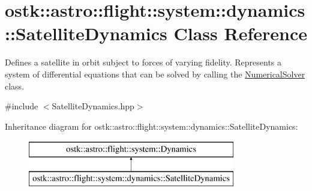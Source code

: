 \hypertarget{classostk_1_1astro_1_1flight_1_1system_1_1dynamics_1_1_satellite_dynamics}{}\section{ostk\+:\+:astro\+:\+:flight\+:\+:system\+:\+:dynamics\+:\+:Satellite\+Dynamics Class Reference}
\label{classostk_1_1astro_1_1flight_1_1system_1_1dynamics_1_1_satellite_dynamics}


Defines a satellite in orbit subject to forces of varying fidelity. Represents a system of differential equations that can be solved by calling the \hyperlink{classostk_1_1astro_1_1_numerical_solver}{Numerical\+Solver} class.  




{\ttfamily \#include $<$Satellite\+Dynamics.\+hpp$>$}

Inheritance diagram for ostk\+:\+:astro\+:\+:flight\+:\+:system\+:\+:dynamics\+:\+:Satellite\+Dynamics\+:\begin{figure}[H]
\begin{center}
\leavevmode
\includegraphics[height=2.000000cm]{classostk_1_1astro_1_1flight_1_1system_1_1dynamics_1_1_satellite_dynamics}
\end{center}
\end{figure}
